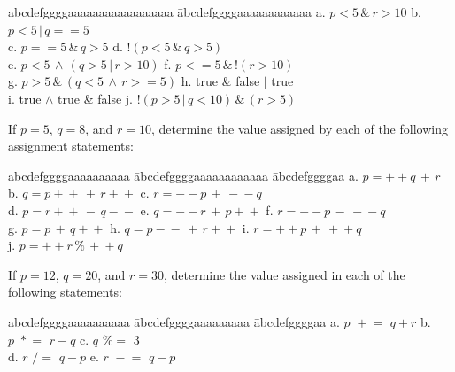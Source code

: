 {\begin{list}{E \thechapter.\theenumi}

\begin{tabbing}
abcdefggggaaaaaaaaaaaaaaaaa \= abcdefggggaaaaaaaaaaaa \kill
a. $p < 5 \,\&\, r > 10$ \> b. $p < 5 \,\vert\, q == 5$  \\
c. $p == 5 \,\&\, q > 5$ \> d. $!(p < 5 \,\&\, q > 5)$ \\
e. $p < 5 \,\wedge\, (q > 5 \,\vert\, r >10)$ \> f. $p <= 5 \,\&\, !(r > 10)$ \\
g. $p > 5 \,\&\, (q < 5 \,\wedge\, r >=  5)$ \> h. true \& false $\vert$ true \\
i. true $\wedge$ true \& false \> j. $!(p > 5 \,\vert\, q < 10)
\,\&\, (r > 5)$
\end{tabbing}


\item If $p = 5$, $q = 8$, and $r = 10$, determine the value
assigned by each of the following assignment statements:


\begin{tabbing}
abcdefggggaaaaaaaaaa \= abcdefggggaaaaaaaaaaaa \= abcdefggggaa
 \kill
  a. $p = +\!+\!q \,+\, r$ \> b. $q = p\!+\!+ \,+\, r\!+\!+$ \> c. $r = -\!-\!p \,+\, -\!-\!q$ \\
  d. $p = r\!+\!+ \,-\, q\!-\!-$ \> e. $q = -\!-\!r \,+\, p\!+\!+$ \> f. $r = -\!-\!p \,-\, -\!-\!q$ \\
  g. $p = p \,+\, q\!+\!+$ \> h. $q = p\!-\!- \,+\, r\!+\!+$ \> i. $r = +\!+\!p \,+\, +\!+\!q$ \\
  j. $p = +\!+\!r \,\%\, +\!+q $ \> \>
\end{tabbing}


\item If $p = 12$, $q = 20$, and $r = 30$, determine the value
assigned in each of the following statements:


\begin{tabbing}
abcdefggggaaaaaaaaaa \= abcdefggggaaaaaaaaa \= abcdefggggaa
 \kill
  a. $p \,\, +\!\!= \,\, q + r$ \> b. $p \,\, \ast\!\!= \,\, r - q$ \> c. $q \,\, \%\!\!= \,\,3$ \\
  d. $r \,\, /\!\!= \,\, q - p$ \> e. $r \,\,-\!\!= \,\,q - p$ \>
\end{tabbing}


\end{list}}
